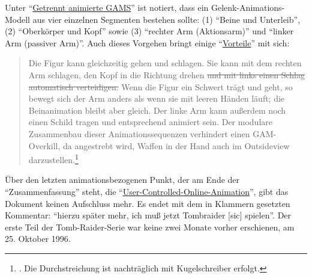 \documentclass[a5paper,pagesize,numbers=noenddot]{scrbook}
\begin{document}
Unter \enquote{\uline{Getrennt animierte GAMS}} ist notiert, dass ein Gelenk-Animations-Modell aus vier einzelnen Segmenten bestehen sollte:
(1) \enquote{Beine und Unterleib}, (2) \enquote{Oberkörper und Kopf} sowie (3) \enquote{rechter Arm (Aktionsarm)} und \enquote{linker Arm (passiver Arm)}.\autocite[S.~2]{orpheus_zusammenfassung_1996}
Auch dieses Vorgehen bringt einige \enquote{\uline{Vorteile}} mit sich:

\begin{quote}
   Die Figur kann gleichzeitig gehen und schlagen.
   Sie kann mit dem rechten Arm schlagen, den Kopf in die Richtung drehen \sout{und mit links einen Schlag automatisch verteidigen.}
   Wenn die Figur ein Schwert trägt und geht, so bewegt sich der Arm anders als wenn sie mit leeren Händen läuft; die Beinanimation bleibt aber gleich.
   Der linke Arm kann außerdem noch einen Schild tragen und entsprechend animiert sein.
   Der modulare Zusammenbau dieser Animationssequenzen verhindert einen GAM-Overkill, da angestrebt wird, Waffen in der Hand auch im Outsideview darzustellen.\footnote{\autocite[S.~2]{orpheus_zusammenfassung_1996}. Die Durchstreichung ist nachträglich mit Kugelschreiber erfolgt.}
\end{quote}

Über den letzten animationsbezogenen Punkt, der am Ende der \enquote{Zusammenfassung} steht, die \enquote{\uline{User-Controlled-Online-Animation}}, gibt das Dokument keinen Aufschluss mehr. %
Es endet mit dem in Klammern gesetzten Kommentar: \enquote{hierzu später mehr, ich muß jetzt Tombraider [sic] spielen}.\autocite[S.~3]{orpheus_zusammenfassung_1996}
Der erste Teil der Tomb-Raider-Serie war keine zwei Monate vorher erschienen, am 25. Oktober 1996.


\end{document}
